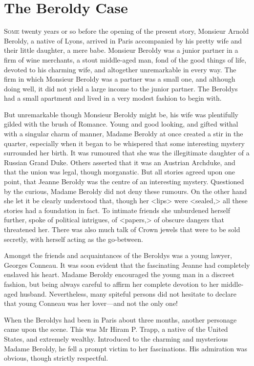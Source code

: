 \chapter{The Beroldy Case}

\lettrine{S}{ome} twenty years or so before the opening of the present story, Monsieur Arnold Beroldy, a native of Lyons, arrived in Paris accompanied by his pretty wife and their little daughter, a mere babe. Monsieur Beroldy was a junior partner in a firm of wine merchants, a stout middle-aged man, fond of the good things of life, devoted to his charming wife, and altogether unremarkable in every way. The firm in which Monsieur Beroldy was a partner was a small one, and although doing well, it did not yield a large income to the junior partner. The Beroldys had a small apartment and lived in a very modest fashion to begin with. 

 But unremarkable though Monsieur Beroldy might be, his wife was plentifully gilded with the brush of Romance. Young and good looking, and gifted withal with a singular charm of manner, Madame Beroldy at once created a stir in the quarter, especially when it began to be whispered that some interesting mystery surrounded her birth. It was rumoured that she was the illegitimate daughter of a Russian Grand Duke. Others asserted that it was an Austrian Archduke, and that the union was legal, though morganatic. But all stories agreed upon one point, that Jeanne Beroldy was the centre of an interesting mystery. Questioned by the curious, Madame Beroldy did not deny these rumours. On the other hand she let it be clearly understood that, though her <lips> were <sealed,> all these stories had a foundation in fact. To intimate friends she unburdened herself further, spoke of political intrigues, of <papers,> of obscure dangers that threatened her. There was also much talk of Crown jewels that were to be sold secretly, with herself acting as the go-between. 

 Amongst the friends and acquaintances of the Beroldys was a young lawyer, Georges Conneau. It was soon evident that the fascinating Jeanne had completely enslaved his heart. Madame Beroldy encouraged the young man in a discreet fashion, but being always careful to affirm her complete devotion to her middle-aged husband. Nevertheless, many spiteful persons did not hesitate to declare that young Conneau was her lover—and not the only one! 

 When the Beroldys had been in Paris about three months, another personage came upon the scene. This was Mr Hiram P. Trapp, a native of the United States, and extremely wealthy. Introduced to the charming and mysterious Madame Beroldy, he fell a prompt victim to her fascinations. His admiration was obvious, though strictly respectful. 

